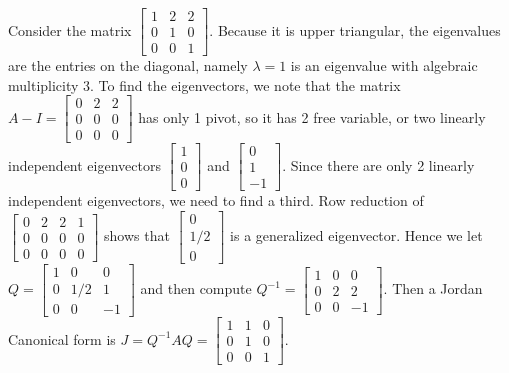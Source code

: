 \begin{example}
Consider the matrix 
$ \begin{bmatrix} 
1&2&2\\
0&1&0\\
0&0&1
\end{bmatrix} 
$.  Because it is upper triangular, the eigenvalues are the entries on the diagonal, namely $\lambda = 1$ is an eigenvalue with algebraic multiplicity 3. To find the eigenvectors, we note that the matrix 
$A-I= \begin{bmatrix} 
0&2&2\\
0&0&0\\
0&0&0
\end{bmatrix} 
$
has only 1 pivot, so it has 2 free variable, or two linearly independent eigenvectors 
$\begin{bmatrix} 
1\\
0\\
0
\end{bmatrix}$ 
and
$\begin{bmatrix} 
0\\
1\\
-1
\end{bmatrix}$. 
Since there are only 2 linearly independent eigenvectors, we need to find a third.  Row reduction of $\begin{bmatrix} 
0&2&2&1\\
0&0&0&0\\
0&0&0&0
\end{bmatrix}$ 
shows that  
$\begin{bmatrix} 
0\\
1/2\\
0
\end{bmatrix}$ is a generalized eigenvector.  Hence we let $Q=\begin{bmatrix} 
1&0&0\\
0&1/2&1\\
0&0&-1
\end{bmatrix} 
$ and then compute $Q^{-1} = \begin{bmatrix} 
1&0&0\\
0&2&2\\
0&0&-1
\end{bmatrix} 
$. 
Then a Jordan Canonical form is $J=Q^{-1}AQ=\begin{bmatrix} 
1&1&0\\
0&1&0\\
0&0&1
\end{bmatrix} 
$. 

\end{example}





